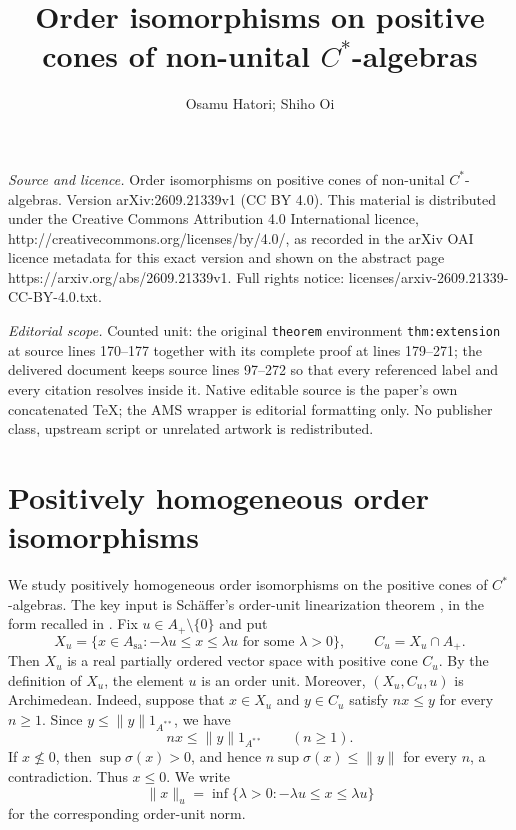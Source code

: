 \documentclass[10pt,a4paper]{amsart}
\newcommand{\sa}{\mathrm{sa}}
\begin{document}
\title[Order isomorphisms on positive cones of non-unital C^*-algeb]{Order isomorphisms on positive cones of non-unital $C^*$-algebras}
\author{Osamu Hatori; Shiho Oi}
\date{}
\maketitle
\noindent\emph{Source and licence.} Order isomorphisms on positive cones of non-unital $C^*$-algebras. Version arXiv:2609.21339v1 (CC BY 4.0). This material is distributed under the Creative Commons Attribution 4.0 International licence, http://creativecommons.org/licenses/by/4.0/, as recorded in the arXiv OAI licence metadata for this exact version and shown on the abstract page https://arxiv.org/abs/2609.21339v1. Full rights notice: licenses/arxiv-2609.21339-CC-BY-4.0.txt.\par\smallskip
\noindent\textit{Editorial scope.} Counted unit: the original \texttt{theorem} environment \texttt{thm:extension} at source lines 170--177 together with its complete proof at lines 179--271; the delivered document keeps source lines 97--272 so that every referenced label and every citation resolves inside it. Native editable source is the paper's own concatenated TeX; the AMS wrapper is editorial formatting only. No publisher class, upstream script or unrelated artwork is redistributed.
\section{Positively homogeneous order isomorphisms}\label{section2}
We study positively homogeneous order isomorphisms on the positive cones of $C^{*}$-algebras.  The key input is Sch\"affer's order-unit linearization theorem \cite[Theorem~B]{SchafferGauge}, in the
form recalled in \cite[Theorem~5.2]{LGI}.
Fix $u\in A_+\setminus\{0\}$ and put
\[
 X_u=\{x\in A_{\sa}: -\lambda u\le x\le \lambda u
       \text{ for some }\lambda>0\},
 \qquad
 C_u=X_u\cap A_+.
\]
Then $X_u$ is a real partially ordered vector space with positive cone
$C_u$.  By the definition of $X_u$, the element $u$ is an order unit.
Moreover, $(X_u,C_u,u)$ is Archimedean.  Indeed, suppose that $x\in X_u$
and $y\in C_u$ satisfy $nx\le y$ for every $n\ge1$.  Since
$y\le\|y\|1_{A^{**}}$, we have
\[
        nx\le\|y\|1_{A^{**}} \qquad(n\ge1).
\]
If $x\not\le0$, then $\sup\sigma(x)>0$, and hence
$n\sup\sigma(x)\le\|y\|$ for every $n$, a contradiction.  Thus $x\le0$.
We write
\[
 \|x\|_u=\inf\{\lambda>0:-\lambda u\le x\le\lambda u\}
\]
for the corresponding order-unit norm.
\end{document}
